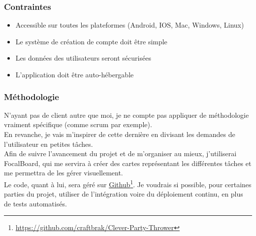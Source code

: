\subsubsection{Contraintes}
\begin{itemize}
    \item Accessible sur toutes les plateformes (Android, IOS, Mac, Windows, Linux)
    \item Le système de création de compte doit être simple
    \item Les données des utilisateurs seront sécurisées
    \item L’application doit être auto-hébergable
\end{itemize}

\subsubsection{Méthodologie}
N’ayant pas de client autre que moi, je ne compte pas appliquer de méthodologie vraiment spécifique (comme scrum par exemple).\\
En revanche, je vais m’inspirer de cette dernière en divisant les demandes de l’utilisateur en petites tâches.\\
Afin de suivre l’avancement du projet et de m’organiser au mieux, j’utiliserai FocalBoard, qui me servira à créer des cartes représentant les différentes tâches et me permettra de les gérer visuellement.\\
Le code, quant à lui, sera géré sur \href{https://github.com/craftbrak/Clever-Party-Thrower}{Github}\footnote{\url{https://github.com/craftbrak/Clever-Party-Thrower}}.
Je voudrais si possible, pour certaines parties du projet, utiliser de l'intégration voire du déploiement continu, en plus de tests automatisés.